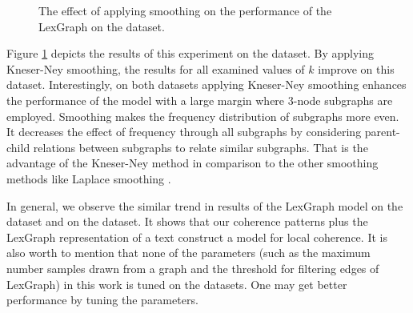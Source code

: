 \begin{figure}[!ht]
  \begin{center}
      \mydata
  \end{center}
  \caption{The effect of applying smoothing on the performance of the LexGraph on the \declercqds dataset.} 
  \label{fig:declercq-smoothing}
\end{figure}


Figure \ref{fig:declercq-smoothing} depicts the results of this experiment on the \declercqds dataset. 
By applying Kneser-Ney smoothing, the results for all examined values of $k$ improve on this dataset.  
Interestingly, on both datasets applying Kneser-Ney smoothing enhances the performance of the model with a large margin where 3-node subgraphs are employed. 
Smoothing makes the frequency distribution of subgraphs more even. 
It decreases the effect of frequency through all subgraphs by considering parent-child relations between subgraphs to relate similar subgraphs. 
That is the advantage of the \mbox{Kneser-Ney} method in comparison to the other smoothing methods like Laplace smoothing \cite{jurafsky08}. 

In general, we observe the similar trend in results of the LexGraph model on the \declercqds dataset and on the \pitlerds dataset. 
It shows that our coherence patterns plus the LexGraph representation of a text construct a model for local coherence.  
It is also worth to mention that none of the parameters (such as the maximum number samples drawn from a graph and the threshold for filtering edges of LexGraph) in this work is tuned on the datasets. 
One may get better performance by tuning the parameters.

